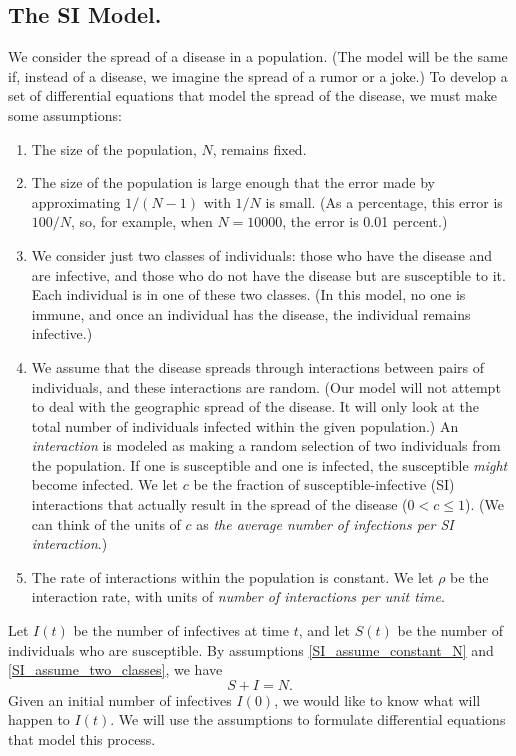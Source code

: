 \subsection{The SI Model.}
\label{sec:SIModel}
We consider the spread of a
disease in a population.
(The model will be the same if, instead of a disease,
we imagine the spread of a rumor or a joke.)
To develop a set of differential equations that model
the spread of the disease, we must make some assumptions:
\begin{enumerate}
\item
\label{SI_assume_constant_N}
The size of the population, $N$, remains fixed.
\item
\label{SI_assume_large_N}
The size of the population is
large enough that the error made by approximating
$1/(N-1)$ with $1/N$ is small. (As a percentage,
this error is $100/N$, so, for example, when
$N=10000$, the error is 0.01 percent.)
\item
\label{SI_assume_two_classes}
We  consider just two classes
of individuals: those who have the disease and are infective,
and those who do 
not have the disease but are susceptible to it.
Each individual is in one of these two classes.
(In this model, no one is immune, and once an individual
has the disease, the individual remains infective.)
\item
\label{SI_assume_random}
We assume that the disease spreads through
interactions between pairs of individuals, and
these interactions are random.
(Our model will not attempt to deal with the geographic spread
of the disease. It will only look at the total number of
individuals infected within the given population.)
An \emph{interaction} is modeled as making a random
selection of
two individuals from the population.
If one is susceptible and one is infected, the
susceptible \emph{might} become infected.
We let $c$ be the fraction of 
susceptible-infective (SI) interactions
that actually result in the spread of the disease
($0 < c \le 1$).
(We can think of the units of $c$ as
\emph{the average number of infections
per SI interaction}.) 
\item
\label{SI_assume_const_rate}
The rate of interactions within the population is constant.
We let $\rho$ be the interaction rate, with units of
\emph{number of interactions per unit time}.
\end{enumerate}

Let $I(t)$ be the number of infectives at time $t$,
and let $S(t)$ be the number of individuals who are susceptible.
By assumptions \eqref{SI_assume_constant_N} 
and \eqref{SI_assume_two_classes}, we have
\begin{equation}
   S+I = N.
\end{equation}
Given an initial number of infectives $I(0)$, we would like
to know what will happen to $I(t)$.
We will use the assumptions to formulate differential
equations that model this process.

